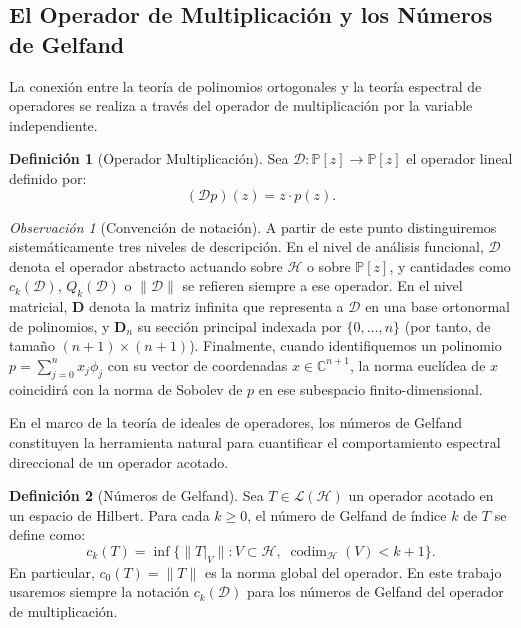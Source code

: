 \documentclass[12pt,a4paper]{article}
\theoremstyle{definition}
\newtheorem{definition}{Definición}
\theoremstyle{remark}
\newtheorem{remark}{Observación}
\newcommand{\Poly}{\mathbb{P}[z]}
\newcommand{\D}{\mathcal{D}}
\begin{document}
\subsection{El Operador de Multiplicación y los Números de Gelfand}

La conexión entre la teoría de polinomios ortogonales y la teoría espectral de operadores se realiza a través del operador de multiplicación por la variable independiente.

\begin{definition}[Operador Multiplicación] \label{def:operador_multiplicacion}
  Sea $\D: \Poly \to \Poly$ el operador lineal definido por:
  \begin{equation}
    (\D p)(z) = z \cdot p(z).
  \end{equation}
\end{definition}

\begin{remark}[Convención de notación]
  A partir de este punto distinguiremos sistemáticamente tres niveles de descripción. En el nivel de análisis funcional, $\D$ denota el operador abstracto actuando sobre $\mathcal{H}$ o sobre $\Poly$, y cantidades como $c_k(\D)$, $Q_k(\D)$ o $\|\D\|$ se refieren siempre a ese operador. En el nivel matricial, $\mathbf{D}$ denota la matriz infinita que representa a $\D$ en una base ortonormal de polinomios, y $\mathbf{D}_n$ su sección principal indexada por $\{0,\dots,n\}$ (por tanto, de tamaño $(n+1)\times(n+1)$). Finalmente, cuando identifiquemos un polinomio $p = \sum_{j=0}^{n} x_j \phi_j$ con su vector de coordenadas $x \in \mathbb{C}^{n+1}$, la norma euclídea de $x$ coincidirá con la norma de Sobolev de $p$ en ese subespacio finito-dimensional.
\end{remark}

En el marco de la teoría de ideales de operadores, los números de Gelfand constituyen la herramienta natural para cuantificar el comportamiento espectral direccional de un operador acotado.

\begin{definition}[Números de Gelfand]\label{def:numeros_gelfand}
  Sea $T \in \mathcal{L}(\mathcal{H})$ un operador acotado en un espacio de Hilbert. Para cada $k\ge 0$, el número de Gelfand de índice $k$ de $T$ se define como:
  \begin{equation}
    c_k(T) = \inf \{ \|T|_V\| : V \subset \mathcal{H}, \; \operatorname{codim}_{\mathcal{H}}(V) < k+1 \}.
  \end{equation}
  En particular, $c_0(T) = \|T\|$ es la norma global del operador. En este trabajo usaremos siempre la notación $c_k(\D)$ para los números de Gelfand del operador de multiplicación.
\end{definition}
\end{document}
